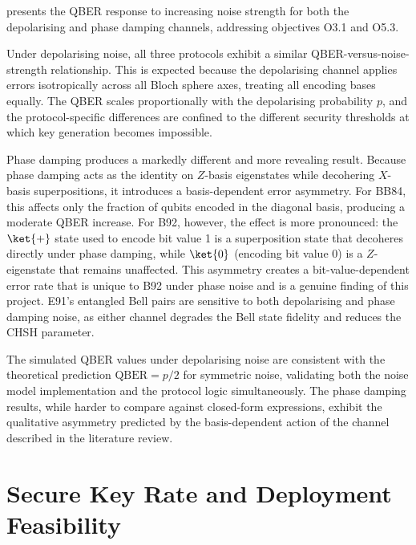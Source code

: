  presents the QBER response to increasing noise strength for both the depolarising and phase damping channels, addressing objectives O3.1 and O5.3.

Under depolarising noise, all three protocols exhibit a similar QBER-versus-noise-strength relationship. This is expected because the depolarising channel applies errors isotropically across all Bloch sphere axes, treating all encoding bases equally. The QBER scales proportionally with the depolarising probability $p$, and the protocol-specific differences are confined to the different security thresholds at which key generation becomes impossible.

Phase damping produces a markedly different and more revealing result. Because phase damping acts as the identity on $Z$-basis eigenstates while decohering $X$-basis superpositions, it introduces a basis-dependent error asymmetry. For BB84, this affects only the fraction of qubits encoded in the diagonal basis, producing a moderate QBER increase. For B92, however, the effect is more pronounced: the $\ket{+}$ state used to encode bit value 1 is a superposition state that decoheres directly under phase damping, while $\ket{0}$ (encoding bit value 0) is a $Z$-eigenstate that remains unaffected. This asymmetry creates a bit-value-dependent error rate that is unique to B92 under phase noise and is a genuine finding of this project. E91's entangled Bell pairs are sensitive to both depolarising and phase damping noise, as either channel degrades the Bell state fidelity and reduces the CHSH parameter.

The simulated QBER values under depolarising noise are consistent with the theoretical prediction $\text{QBER} = p/2$ for symmetric noise, validating both the noise model implementation and the protocol logic simultaneously. The phase damping results, while harder to compare against closed-form expressions, exhibit the qualitative asymmetry predicted by the basis-dependent action of the channel described in the literature review.



\section{Secure Key Rate and Deployment Feasibility}

